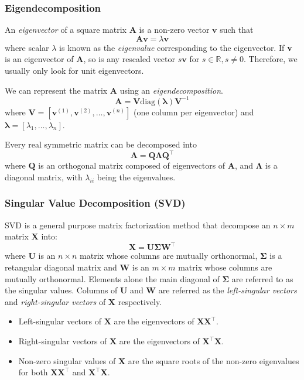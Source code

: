 \documentclass{beamer}
\begin{document}
\begin{frame}
  \frametitle{Eigendecomposition}

  \small
  An \emph{eigenvector} of a square matrix $\bm{A}$ is a non-zero vector $\bm{v}$ such that
  \begin{equation*}
    \bm{A}\bm{v}=\lambda\bm{v}
  \end{equation*}
  where scalar $\lambda$ is known as the \emph{eigenvalue} corresponding to the eigenvector. If $\bf{v}$ is an eigenvector of $\bm{A}$, so is any rescaled vector $s\bm{v}$ for $s\in\mathbb{R}, s\neq 0$. Therefore, we usually only look for unit eigenvectors.

  We can represent the matrix $\bm{A}$ using an \emph{eigendecomposition}.
  \begin{equation*}
    \bm{A}=\bm{V}\text{diag}(\bm{\lambda})\bm{V}^{-1}
  \end{equation*}
  where $\bm{V}=[\bm{v}^{(1)}, \bm{v}^{(2)}, \ldots, \bm{v}^{(n)}]$ (one column per eigenvector) and $\bm{\lambda}=[\lambda_{1},\ldots,\lambda_{n}]$.

  Every real symmetric matrix can be decomposed into
  \begin{equation*}
    \bm{A}=\bm{Q}\bm{\Lambda}\bm{Q}^{\top}
  \end{equation*}
  where $\bm{Q}$ is an orthogonal matrix composed of eigenvectors of $\bm{A}$, and $\bm{\Lambda}$ is a diagonal matrix, with $\lambda_{ii}$ being the eigenvalues.
\end{frame}

\begin{frame}
  \frametitle{Singular Value Decomposition (SVD)}

  \small
  SVD is a general purpose matrix factorization method that decompose an $n\times m$ matrix $\bm{X}$ into:
  \begin{equation*}
    \bm{X}=\bm{U}\bm{\Sigma}\bm{W}^{\top}
  \end{equation*}
  where $\bm{U}$ is an $n\times n$ matrix whose columns are mutually orthonormal, $\bm{\Sigma}$ is a retangular diagonal matrix and $\bm{W}$ is an $m\times m$ matrix whose columns are mutually orthonormal. Elements alone the main diagonal of $\bm{\Sigma}$ are referred to as the singular values. Columns of $\bm{U}$ and $\bm{W}$ are referred as the \emph{left-singular vectors} and \emph{right-singular vectors} of $\mathbf{X}$ respectively.
  
  \begin{itemize}
    \item Left-singular vectors of $\bm{X}$ are the eigenvectors of $\bm{X}\bm{X}^{\top}$.
    \item Right-singular vectors of $\bm{X}$ are the eigenvectors of $\bm{X}^{\top}\bm{X}$.
    \item Non-zero singular values of $\bm{X}$ are the square roots of the non-zero eigenvalues for both $\bm{X}\bm{X}^{\top}$ and $\bm{X}^{\top}\bm{X}$.
  \end{itemize}
\end{frame}
\end{document}
